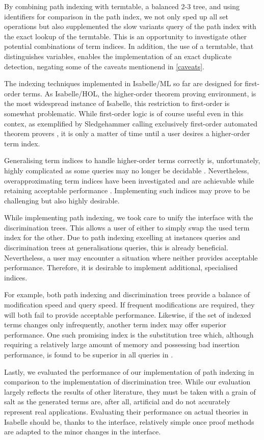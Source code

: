 By combining path indexing with termtable, a balanced 2-3 tree, and using identifiers for comparison in the path index, we not only sped up all set operations but also supplemented the slow variants query of the path index with the exact lookup of the termtable. This is an opportunity to investigate other potential combinations of term indices. In addition, the use of a termtable, that distinguishes variables, enables the implementation of an exact duplicate detection, negating some of the caveats mentionend in \cref{caveats}.

The indexing techniques implemented in Isabelle/ML so far are designed for first-order terms. As Isabelle/HOL, the higher-order theorem proving environment, is the most widespread instance of Isabelle, this restriction to first-order is somewhat problematic. While first-order logic is of course useful even in this contex, as exemplified by Sledgehammer calling exclusively first-order automated theorem provers \cite{bohme_sledgehammer_2010}, it is only a matter of time until a user desires a higher-order term index.

Generalising term indices to handle higher-order terms correctly is, unfortunately, highly complicated as some queries may no longer be decidable \cite{goldfarb_undecidability_1981}. Nevertheless, overapproximating term indices have been investigated and are achievable while retaining acceptable performance \cite{pientka_higher-order_2009,libal_towards_nodate}. Implementing such indices may prove to be challenging but also highly desirable.

While implementing path indexing, we took care to unify the interface with the discrimination trees. This allows a user of either to simply swap the used term index for the other. Due to path indexing excelling at instances queries and discrimination trees at generalisations queries, this is already beneficial. Nevertheless, a user may encounter a situation where neither provides acceptable performance. Therefore, it is desirable to implement additional, specialised indices.

For example, both path indexing and discrimination trees provide a balance of modification speed and query speed. If frequent modifications are required, they will both fail to provide acceptable performance. Likewise, if the set of indexed terms changes only infrequently, another term index may offer superior performance. One such promising index is the substitution tree which, although requiring a relatively large amount of memory and possessing bad insertion performance, is found to be superior in all queries in \cite{carbonell_comparison_1995}.

Lastly, we evaluated the performance of our implementation of path indexing in comparison to the implementation of discrimination tree. While our evaluation largely reflects the results of other literature, they must be taken with a grain of salt as the generated terms are, after all, artificial and do not accurately represent real applications. Evaluating their performance on actual theories in Isabelle should be, thanks to the interface, relatively simple once proof methods are adapted to the minor changes in the interface.
